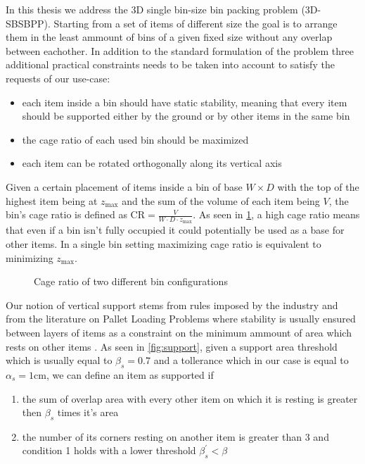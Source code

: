 In this thesis we address the 3D single bin-size bin packing problem (3D-SBSBPP). Starting from a set of items of different size the goal is to arrange them in the least ammount of bins of a given fixed size without any overlap between eachother.
In addition to the standard formulation of the problem three additional practical constraints needs to be taken into account to satisfy the requests of our use-case:
\begin{itemize}
    \item each item inside a bin should have static stability, meaning that every item should be supported either by the ground or by other items in the same bin
    \item the cage ratio of each used bin should be maximized
    \item each item can be rotated orthogonally along its vertical axis
\end{itemize}

Given a certain placement of items inside a bin of base $W \times D$ with the top of the highest item being at $z_\text{max}$ and the sum of the volume of each item being $V$, the bin's cage ratio is defined as $\text{CR} = \frac{V}{W \cdot D \cdot z_\text{max}}$.
As seen in \cref{fig:cage_ratio}, a high cage ratio means that even if a bin isn't fully occupied it could potentially be used as a base for other items. In a single bin setting maximizing cage ratio is equivalent to minimizing $z_\text{max}$.

\begin{figure}[H]
    \scalebox{0.60}{%
    
    }
    \caption{Cage ratio of two different bin configurations}
    \label{fig:cage_ratio}
\end{figure}

Our notion of vertical support stems from rules imposed by the industry and from the literature on Pallet Loading Problems where stability is usually ensured between layers of items as a constraint on the minimum ammount of area which rests on other items \cite{elhedhli2019three}.
As seen in \cref{fig:support}, given a support area threshold which is usually equal to $\beta_s=0.7$ and a tollerance which in our case is equal to $\alpha_s=1\text{cm}$, we can define an item as supported if
\begin{enumerate}
    \item the sum of overlap area with every other item on which it is resting is greater then $\beta_s$ times it's area
    \item the number of its corners resting on another item is greater than 3 and condition 1 holds with a lower threshold $\beta^\prime_s < \beta$
\end{enumerate}

